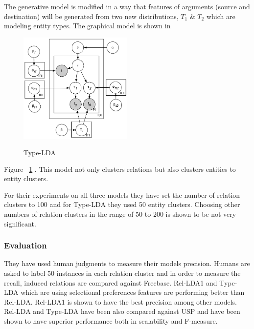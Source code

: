     The generative model is modified in a way that features of arguments (source and destination)
    will be generated from two new distributions, $T_1$ \& $T_2$ which are modeling entity types. The graphical model
    is shown in
     \begin{figure}[h!]
  \caption{Type-LDA}
  \centering
    \includegraphics[width=0.5\textwidth]{type-lda.eps}
    \label{fig:type-lda}
\end{figure} 
Figure ~\ref{fig:type-lda} .
    This model not only clusters relations but also clusters entities to entity clusters.
    
    For their experiments on all three models they have set the number of relation clusters to 100 and for Type-LDA they used 
     50 entity clusters. Choosing other numbers of relation clusters in the range of 50 to 200 is shown to be not very significant.
    
\subsubsection {Evaluation}
\label{ssec:rel-lda-evaluation}

They have used human judgments 
 to measure their models precision. Humans are asked to label 50 instances in each relation cluster and in order to measure
 the recall, induced relations are compared against Freebase. Rel-LDA1 and Type-LDA which are using selectional preferences features
  are performing better than Rel-LDA. Rel-LDA1 is shown to have the best precision among other models. 
  Rel-LDA and Type-LDA have been also compared against
  USP and have been shown to have superior performance both in scalability and F-measure. 
 
